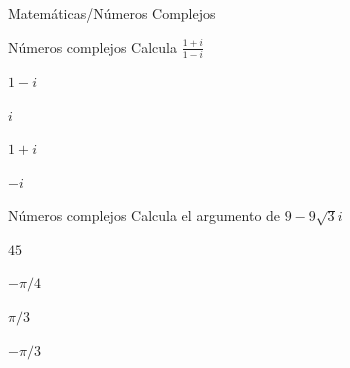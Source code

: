 \documentclass[12pt]{article}
\begin{document}
\begin{quiz}{Matemáticas/Números Complejos}
	 \begin{multi}[shuffle=true,numbering=none]%
	 {Números complejos}
		Calcula $\frac{1+i}{1-i}$
		\item $1-i$
		\item* $i$
		\item $1+i$
		\item $-i$
	 \end{multi}	
	 
	 \begin{multi}[shuffle=true,numbering=none]%
	 {Números complejos}
		Calcula el argumento de $9-9\sqrt{3}i$
		\item $45$
		\item $-\pi/4$
		\item $\pi/3$
		\item* $-\pi/3$
	 \end{multi}	  
	 			
\end{quiz}
\end{document}
